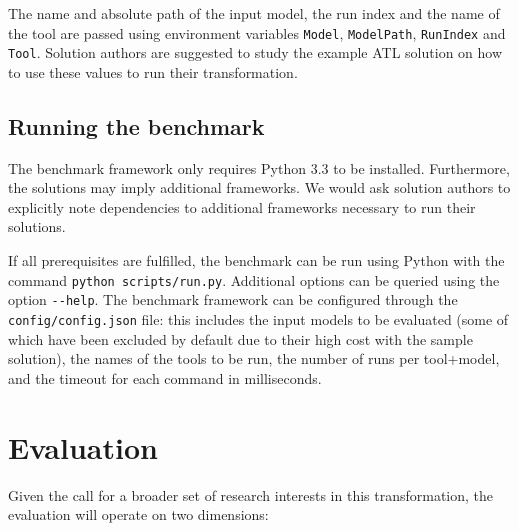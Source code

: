 \documentclass[a4paper]{scrartcl}
\newcommand*{\file}[1]{\texttt{#1}}
\begin{document}
The name and absolute path of the input model, the run index and the name of the
tool are passed using environment variables \file{Model}, \file{ModelPath},
\file{RunIndex} and \file{Tool}. Solution authors are suggested to study the
example ATL solution on how to use these values to run their transformation.

\subsection{Running the benchmark}
\label{sec:running-benchmark}

The benchmark framework only requires Python 3.3 to be installed. Furthermore,
the solutions may imply additional frameworks. We would ask solution authors to
explicitly note dependencies to additional frameworks necessary to run their
solutions.

If all prerequisites are fulfilled, the benchmark can be run using Python with
the command \file{python scripts/run.py}. Additional options can be queried
using the option \file{{-}{-}help}. The benchmark framework can be configured
through the \file{config/config.json} file: this includes the input models to be
evaluated (some of which have been excluded by default due to their high cost
with the sample solution), the names of the tools to be run, the number of runs
per tool+model, and the timeout for each command in milliseconds.

\section{Evaluation}
\label{sec:evaluation}

Given the call for a broader set of research interests in this transformation,
the evaluation will operate on two dimensions:
\end{document}

